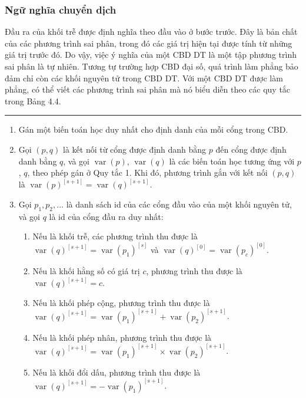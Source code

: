 \subsubsection{Ngữ nghĩa chuyển dịch}
Đầu ra của khối trễ được định nghĩa theo đầu vào ở bước trước. Đây là bản chất của các phương trình sai phân, trong đó các giá trị hiện tại được tính từ những giá trị trước đó. Do vậy, việc ý nghĩa của một CBD DT là một tập phương trình sai phân là tự nhiên.
Tương tự trường hợp CBD đại số, quá trình làm phẳng bảo đảm chỉ còn các khối nguyên tử trong CBD DT. Với một CBD DT được làm phẳng, có thể viết các phương trình sai phân mà nó biểu diễn theo các quy tắc trong Bảng 4.4.
\begin{table}[htbp]
\caption{Ngữ nghĩa chuyển dịch của một CBD DT được làm phẳng}
\begin{minipage}{\linewidth}\small\hrule\medskip
\begin{enumerate}
\item Gán một biến toán học duy nhất cho định danh của mỗi cổng trong CBD.
\item Gọi $(p,q)$ là kết nối từ cổng được định danh bằng $p$ đến cổng được định danh bằng $q$, và gọi $\operatorname{var}(p)$, $\operatorname{var}(q)$ là các biến toán học tương ứng với $p$, $q$, theo phép gán ở Quy tắc 1. Khi đó, phương trình gắn với kết nối $(p,q)$ là $\operatorname{var}(p)^{[s+1]}=\operatorname{var}(q)^{[s+1]}$.
\item Gọi $p_1,p_2,\ldots$ là danh sách id của các cổng đầu vào của một khối nguyên tử, và gọi $q$ là id của cổng đầu ra duy nhất:
\begin{enumerate}
\renewcommand{\labelenumii}{\alph{enumii}.}
\item Nếu là khối trễ, các phương trình thu được là $\operatorname{var}(q)^{[s+1]}=\operatorname{var}(p_1)^{[s]}$ và $\operatorname{var}(q)^{[0]}=\operatorname{var}(p_c)^{[0]}$.
\item Nếu là khối hằng số có giá trị $c$, phương trình thu được là $\operatorname{var}(q)^{[s+1]}=c$.
\item Nếu là khối phép cộng, phương trình thu được là $\operatorname{var}(q)^{[s+1]}=\operatorname{var}(p_1)^{[s+1]}+\operatorname{var}(p_2)^{[s+1]}$.
\item Nếu là khối phép nhân, phương trình thu được là $\operatorname{var}(q)^{[s+1]}=\operatorname{var}(p_1)^{[s+1]}\times\operatorname{var}(p_2)^{[s+1]}$.
\item Nếu là khối đổi dấu, phương trình thu được là $\operatorname{var}(q)^{[s+1]}=-\operatorname{var}(p_1)^{[s+1]}$.

\end{enumerate}
\end{enumerate}
\end{minipage}
\end{table}
